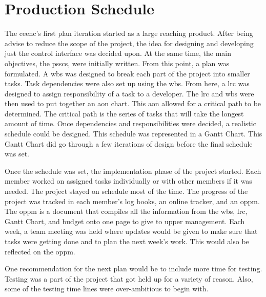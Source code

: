 \section{Production Schedule}
The \gls{ceenc}'s first plan iteration started as a large reaching product.
After being advise to reduce the scope of the project, the idea for designing and developing just the control interface was decided upon.
At the same time, the main objectives, the \gls{pssc}s, were initially written.
From this point, a plan was formulated.
A \gls{wbs} was designed to break each part of the project into smaller tasks.
Task dependencies were also set up using the \gls{wbs}. 
From here, a \gls{lrc} was designed to assign responsibility of a task to a developer.
The \gls{lrc} and \gls{wbs} were then used to put together an \gls{aon} chart.
This \gls{aon} allowed for a critical path to be determined. 
The critical path is the series of tasks that will take the longest amount of time.
Once dependencies and responsibilities were decided, a realistic schedule could be designed.
This schedule was represented in a Gantt Chart.
This Gantt Chart did go through a few iterations of design before the final schedule was set.

Once the schedule was set, the implementation phase of the project started. 
Each member worked on assigned tasks individually or with other members if it was needed.
The project stayed on schedule most of the time.
The progress of the project was tracked in each member's log books, an online tracker, and an \gls{oppm}.
The \gls{oppm} is a document that compiles all the information from the \gls{wbs}, \gls{lrc}, Gantt Chart, and budget onto one page to give to upper management.
Each week, a team meeting was held where updates would be given to make sure that tasks were getting done and to plan the next week's work.
This would also be reflected on the \gls{oppm}.

One recommendation for the next plan would be to include more time for testing. 
Testing was a part of the project that got held up for a variety of reason.
Also, some of the testing time lines were over-ambitious to begin with.
